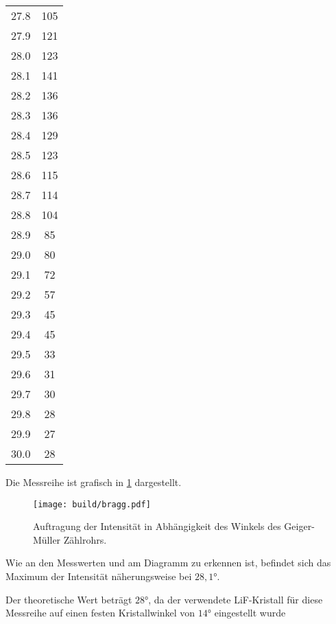 \begin{table}[htp]
\begin{center}
\begin{tabular}{SS}
                        27.8 & 105\\
                        27.9 & 121\\
                        28.0 & 123\\
                        28.1 & 141\\
                        28.2 & 136\\
                        28.3 & 136\\
                        28.4 & 129\\
                        28.5 & 123\\
                        28.6 & 115\\
                        28.7 & 114\\
                        28.8 & 104\\
                        28.9 & 85\\
                        29.0 & 80\\
                        29.1 & 72\\
                        29.2 & 57\\
                        29.3 & 45\\
                        29.4 & 45\\
                        29.5 & 33\\
                        29.6 & 31\\
                        29.7 & 30\\
                        29.8 & 28\\
                        29.9 & 27\\
                        30.0 & 28\\
                \bottomrule
                \end{tabular}
        \end{center}
\end{table}

Die Messreihe ist grafisch in \ref{fig:bragg} dargestellt.

\begin{figure}
  \centering
  \texttt{[image: build/bragg.pdf]}
  \caption{Auftragung der Intensität in Abhängigkeit des Winkels des Geiger-Müller Zählrohrs.}
  \label{fig:bragg}
\end{figure}

Wie an den Messwerten und am Diagramm zu erkennen ist, befindet sich das Maximum
der Intensität näherungsweise bei $28{,}1°$.

Der theoretische Wert beträgt $28°$, da der verwendete LiF-Kristall für diese Messreihe
auf einen festen Kristallwinkel von $14°$ eingestellt wurde

